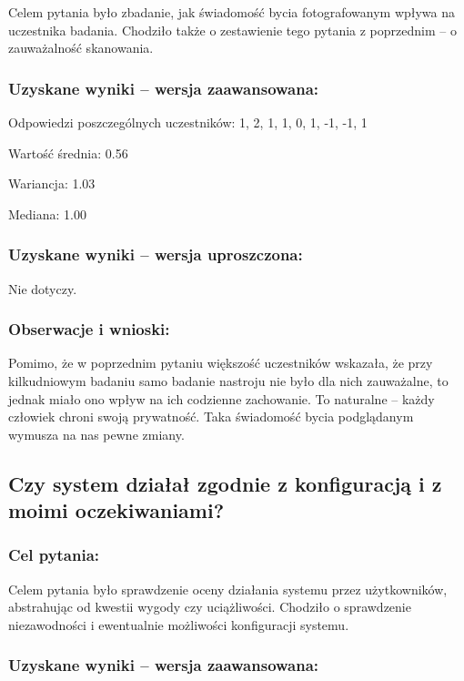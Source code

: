 	Celem pytania było zbadanie, jak świadomość bycia fotografowanym wpływa na uczestnika badania. Chodziło także o zestawienie tego pytania z poprzednim -- o zauważalność skanowania.
	
	\subsubsection{Uzyskane wyniki -- wersja zaawansowana:}
	
	Odpowiedzi poszczególnych uczestników: 1, 2, 1, 1, 0, 1, -1, -1, 1
	
	Wartość średnia: 0.56
	
	Wariancja: 1.03
	
	Mediana: 1.00
	
	\subsubsection{Uzyskane wyniki -- wersja uproszczona:}
	
	Nie dotyczy.
	
	\subsubsection{Obserwacje i wnioski:}
	
	Pomimo, że w poprzednim pytaniu większość uczestników wskazała, że przy kilkudniowym badaniu samo badanie nastroju nie było dla nich zauważalne, to jednak miało ono wpływ na ich codzienne zachowanie. To naturalne -- każdy człowiek chroni swoją prywatność. Taka świadomość bycia podglądanym wymusza na nas pewne zmiany.
	
	
\subsection{Czy system działał zgodnie z konfiguracją i z moimi oczekiwaniami?}
	
	\subsubsection{Cel pytania:}
	
	Celem pytania było sprawdzenie oceny działania systemu przez użytkowników, abstrahując od kwestii wygody czy uciążliwości. Chodziło o sprawdzenie niezawodności i ewentualnie możliwości konfiguracji systemu.
	
	\subsubsection{Uzyskane wyniki -- wersja zaawansowana:}
	
